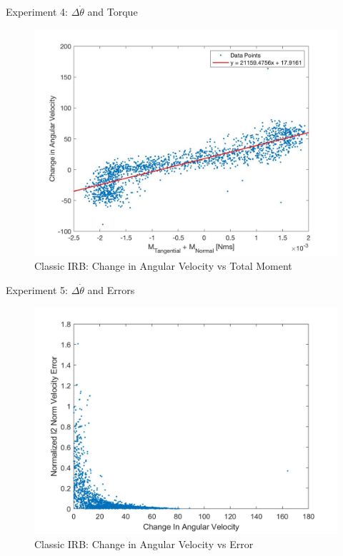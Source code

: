 \begin{frame}{Experiment 4: $\Delta \dot \theta$ and Torque}

\begin{figure}
    \centering
    \includegraphics[scale=0.21]{figures/AngularVvsMoment.jpg}
    \caption{Classic IRB: Change in Angular Velocity vs Total Moment}
    \label{fig:MomentsError}
\end{figure}

\end{frame}

\begin{frame}{Experiment 5: $\Delta \dot \theta$ and Errors}

\begin{figure}
    \centering
    \includegraphics[scale=0.17]{figures/changeInOmegaEllipse.jpg}
    \caption{Classic IRB: Change in Angular Velocity vs Error}
    \label{fig:AngularVError}
\end{figure}
\end{frame}

